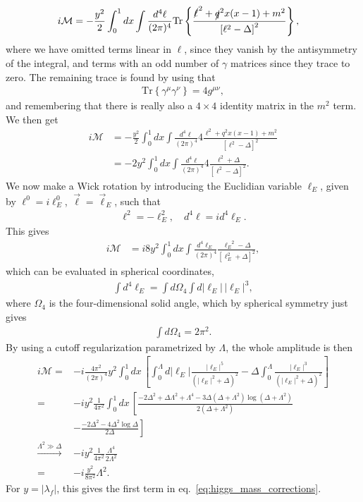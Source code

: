 \documentclass[twoside,english]{uiofysmaster}
\begin{document}
\begin{align}
	i\mathcal{M} &= -\frac{y^2}{2}\int_0^1 dx \int \frac{d^4\ell}{(2\pi)^4} \mathrm{Tr}\left\{ \frac{ \slashed{\ell}^2 + \slashed{q}^2x(x-1) + m^2}{\left[ \ell^2 - \Delta \right]^2}  \right\},
\end{align}
where we have omitted terms linear in $\ell$, since they vanish by the antisymmetry of the integral, and terms with an odd number of $\gamma$ matrices since they trace to zero. The remaining trace is found by using that
\begin{align}
	\mathrm{Tr} \left\{ \gamma^\mu \gamma^\nu\right\} = 4g^{\mu\nu},
\end{align}
and remembering that there is really also a $4\times 4$ identity matrix in the $m^2$ term. We then get
\begin{align}
	i\mathcal{M} &= -\frac{y^2}{2}\int_0^1 dx \int \frac{d^4\ell}{(2\pi)^4} 4 \frac{ {\ell}^2 + {q}^2x(x-1) + m^2}{\left[ \ell^2 - \Delta \right]^2}  \\
				&= -2y^2\int_0^1 dx \int \frac{d^4\ell}{(2\pi)^4} 4 \frac{ {\ell}^2 + \Delta}{\left[ \ell^2 - \Delta \right]^2}.\nonumber
\end{align}
We now make a Wick rotation by introducing the Euclidian variable $\ell_E$, given by $\ell^0 = i\ell^0_E$, $\vec\ell = \vec\ell_E$, such that
\begin{align}
	\ell^2 = -\ell_E^2, \quad d^4\ell = id^4\ell_E.
\end{align}
This gives
\begin{align}
	i\mathcal{M} &= i8y^2\int_0^1 dx \int \frac{d^4\ell_E}{(2\pi)^4}  \frac{ {\ell_E}^2 - \Delta}{\left[ \ell_E^2 + \Delta \right]^2}, 
\end{align}
which can be evaluated in spherical coordinates,
\begin{align}
	\int d^4\ell_E = \int d\Omega_4 \int d|\ell_E| \, |\ell_E|^3,
\end{align}
where $\Omega_4$ is the four-dimensional solid angle, which by spherical symmetry just gives
\begin{align}
	 \int d\Omega_4 = 2\pi^2.
\end{align}
By using a cutoff regularization parametrized by $\Lambda$, the whole amplitude is then
\begin{align}
	i\mathcal{M} = &-i\frac{4\pi^2}{(2\pi)^4}y^2 \int_0^1 dx\, \left[ \int_0^\Lambda d|\ell_E| \frac{|\ell_E|^5}{\left(|\ell_E|^2 + \Delta\right)^2} - \Delta \int_0^\Lambda \frac{|\ell_E|^3}{\left( |\ell_E|^2 + \Delta \right)^2}\right]\nonumber \\
	= &-iy^2\frac{1}{4\pi^2}\int_0^1 dx \, \left[ \frac{-2\Delta^2 + \Delta \Lambda^2 + \Lambda^4 - 3\Delta\left( \Delta + \Lambda^2\right)\log \left(\Delta + \Lambda^2\right)}{2\left(\Delta + \Lambda^2\right)} \right.\nonumber \\
	&-\left. \frac{-2\Delta^2 - 4\Delta^2\log\Delta}{2\Delta}\right]\\
	\overset{\Lambda^2 \gg \Delta}{\to} &-iy^2\frac{1}{4\pi^2} \frac{\Lambda^4}{2\Lambda^2}\nonumber \\
	= &-i\frac{y^2}{8\pi^2}\Lambda^2.\nonumber
\end{align}
For $y = |\lambda_f|$, this gives the first term in eq.\ \eqref{eq:higgs_mass_corrections}.
\end{document}
